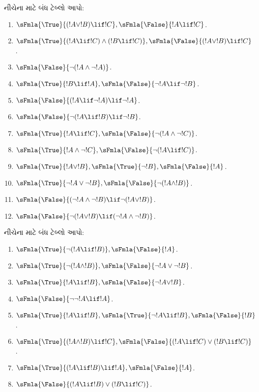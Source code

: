 \begin{prob}
નીચેના માટે બંધ ટેબ્લો આપો:
\begin{enumerate}
\item $\sFmla{\True}{(!A \lor !B) \lif !C}, \sFmla{\False}{!A \lif !C}$.
\item $\sFmla{\True}{(!A \lif !C) \land (!B \lif !C)}, \sFmla{\False}{(!A \lor !B) \lif !C}$.
\item $\sFmla{\False}{\lnot(!A \land \lnot !A)}$.
\item $\sFmla{\True}{!B \lif !A}, \sFmla{\False}{\lnot !A \lif \lnot !B}$.
\item $\sFmla{\False}{(!A \lif \lnot !A) \lif \lnot !A}$.
\item $\sFmla{\False}{\lnot(!A \lif !B) \lif \lnot !B}$.
\item $\sFmla{\True}{!A \lif !C}, \sFmla{\False}{\lnot (!A \land \lnot !C)}$.
\item $\sFmla{\True}{!A \land \lnot !C}, \sFmla{\False}{\lnot (!A \lif !C)}$.
\item $\sFmla{\True}{!A \lor !B}, \sFmla{\True}{\lnot !B},
  \sFmla{\False}{!A}$.
\item $\sFmla{\True}{\lnot !A \lor \lnot !B}, \sFmla{\False}{\lnot(!A \land !B)}$.
\item $\sFmla{\False}{(\lnot !A \land \lnot !B) \lif\lnot(!A \lor !B)}$.
\item $\sFmla{\False}{\lnot(!A \lor !B) \lif (\lnot !A \land \lnot !B)}$.
\end{enumerate}
\end{prob}

\begin{prob}
નીચેના માટે બંધ ટેબ્લો આપો:
\begin{enumerate}
\item $\sFmla{\True}{\lnot(!A \lif !B)}, \sFmla{\False}{!A}$.
\item $\sFmla{\True}{\lnot(!A \land !B)}, \sFmla{\False}{\lnot !A \lor \lnot !B}$.
\item $\sFmla{\True}{!A \lif !B}, \sFmla{\False}{\lnot !A \lor !B}$.
\item $\sFmla{\False}{\lnot \lnot !A \lif !A}$.
\item $\sFmla{\True}{!A \lif !B}, \sFmla{\True}{\lnot !A \lif !B}, \sFmla{\False}{!B}$.
\item $\sFmla{\True}{(!A \land !B) \lif !C}, \sFmla{\False}{(!A \lif !C) \lor (!B \lif !C)}$.
\item $\sFmla{\True}{(!A \lif !B) \lif !A}, \sFmla{\False}{!A}$.
\item $\sFmla{\False}{(!A \lif !B) \lor (!B \lif !C)}$.
\end{enumerate}
\end{prob}
\endgroup


